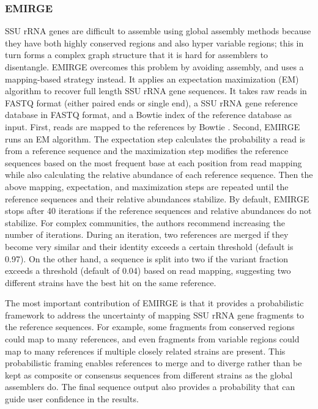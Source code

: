 \documentclass[]{msu-thesis}
\begin{document}
\subsubsection{EMIRGE} 
SSU rRNA genes are difficult to assemble using global
assembly methods because they have both highly conserved regions and
also hyper variable regions; this in turn forms a complex graph
structure that it is hard for assemblers to disentangle. EMIRGE
\cite{miller_assembling_2013} overcomes this problem by avoiding
assembly, and uses a mapping-based strategy instead. It applies an
expectation maximization (EM) algorithm to recover full length SSU rRNA
gene sequences. It takes raw reads in FASTQ format (either paired ends
or single end), a SSU rRNA gene reference database in FASTQ format, and
a Bowtie index of the reference database as input. First, reads are
mapped to the references by Bowtie \cite{langmead_aligning_2010}.
Second, EMIRGE runs an EM algorithm.  The expectation step calculates
the probability a read is from a reference sequence and the maximization
step modifies the reference sequences based on the most frequent base at
each position from read mapping while also calculating the relative
abundance of each reference sequence. Then the above mapping,
expectation, and maximization steps are repeated until the reference
sequences and their relative abundances stabilize. By default, EMIRGE
stops after 40 iterations if the reference sequences and relative
abundances do not stabilize. For complex communities, the authors
recommend increasing the number of iterations. During an iteration, two
references are merged if they become very similar and their identity
exceeds a certain threshold (default is 0.97). On the other hand, a
sequence is split into two if the variant fraction exceeds a threshold
(default of 0.04) based on read mapping, suggesting two different
strains have the best hit on the same reference.

The most important contribution of EMIRGE is that it provides a
probabilistic framework to address the uncertainty of mapping SSU rRNA
gene fragments to the reference sequences. For example, some fragments
from conserved regions could map to many references, and even fragments
from variable regions could map to many references if multiple closely
related strains are present.  This probabilistic framing enables
references to merge and to diverge rather than be kept as composite or
consensus sequences from different strains as the global assemblers do.
The final sequence output also provides a probability that can guide
user confidence in the results.
\end{document}
